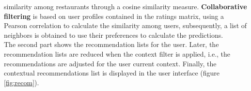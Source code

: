 similarity among restaurants through a cosine similarity measure.
\textbf{Collaborative filtering} is based on user profiles contained in
the ratings matrix, using a Pearson correlation to calculate the similarity
among users, subsequently, a list of neighbors is obtained to use
their preferences to calculate the predictions.\\
The second part shows the recommendation lists for the user. Later,
the recommendation lists are reduced when the context filter is applied,
i.e., the recommendations are adjusted for the user current context.
Finally, the contextual recommendations list is displayed in the user
interface (figure \ref{fig:recom}).






